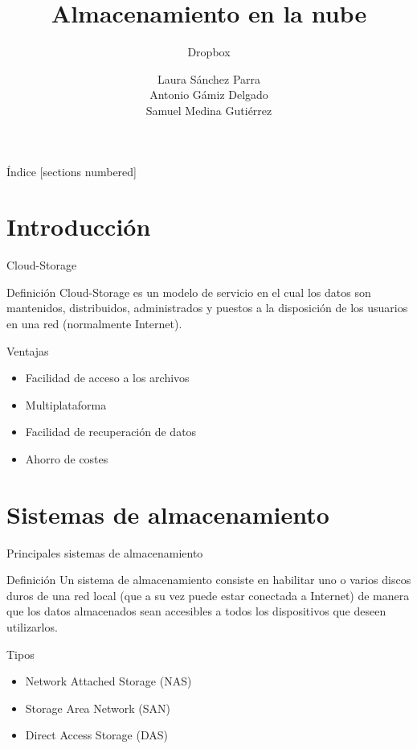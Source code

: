 \documentclass[10pt]{beamer}
\title{Almacenamiento en la nube}
\subtitle{Dropbox}
\date{}
\author{Laura Sánchez Parra\\ Antonio Gámiz Delgado \\ Samuel Medina Gutiérrez }
\institute{Universidad de Granada.}
\begin{document}
\maketitle

\begin{frame}{Índice}
  [sections numbered]
  \tableofcontents[hideallsubsections]
\end{frame}

\section{Introducción}

\begin{frame}[fragile]{Cloud-Storage}
\begin{alertblock}{Definición}
Cloud-Storage es un modelo de servicio en el cual los datos son mantenidos, distribuidos, administrados y puestos a la disposición de los usuarios en una red (normalmente Internet).
\end{alertblock}
\begin{alertblock}{Ventajas}
\begin{itemize}
\item Facilidad de acceso a los archivos
\item Multiplataforma
\item Facilidad de recuperación de datos
\item Ahorro de costes
\end{itemize}
\end{alertblock}

\end{frame}

\section{Sistemas de almacenamiento}

\begin{frame}{Principales sistemas de almacenamiento}
\begin{alertblock}{Definición}
Un sistema de almacenamiento consiste en habilitar uno o varios discos duros de una red local (que a su vez puede estar conectada a Internet) de manera que los datos almacenados sean accesibles a todos los dispositivos que deseen utilizarlos.
\end{alertblock}
\begin{alertblock}{Tipos}
\begin{itemize}
\item Network Attached Storage (NAS)
\item Storage Area Network (SAN)
\item Direct Access Storage (DAS)
\end{itemize}
\end{alertblock}
\end{frame}
\end{document}
